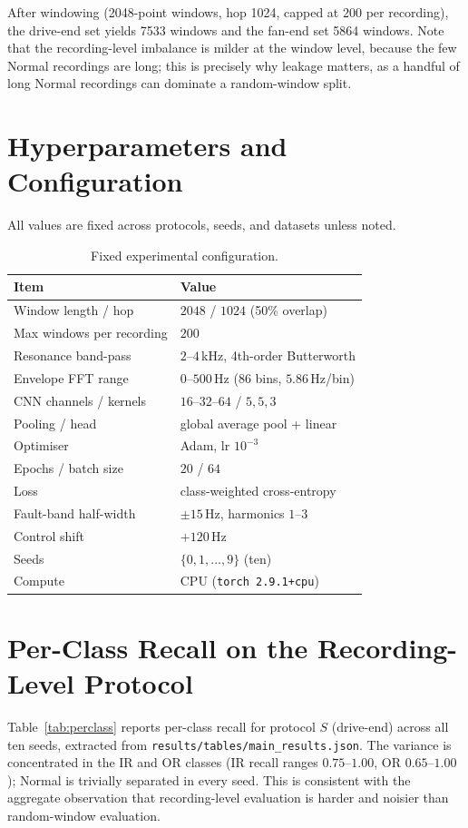\documentclass[11pt]{article}
\begin{document}
After windowing (2048-point windows, hop 1024, capped at 200 per recording), the drive-end
set yields 7533 windows and the fan-end set 5864 windows. Note that the recording-level
imbalance is milder at the window level, because the few Normal recordings are long; this
is precisely why leakage matters, as a handful of long Normal recordings can dominate a
random-window split.

\section{Hyperparameters and Configuration}
\label{app:hyper}
All values are fixed across protocols, seeds, and datasets unless noted.

\begin{table}[H]
\centering
\caption{Fixed experimental configuration.}
\label{tab:hyper}
\begin{tabular}{ll}
\toprule
Item & Value \\
\midrule
Window length / hop & $2048$ / $1024$ (50\% overlap) \\
Max windows per recording & $200$ \\
Resonance band-pass & $2$--$4$\,kHz, 4th-order Butterworth \\
Envelope FFT range & $0$--$500$\,Hz (86 bins, $5.86$\,Hz/bin) \\
CNN channels / kernels & $16$--$32$--$64$ / $5,5,3$ \\
Pooling / head & global average pool + linear \\
Optimiser & Adam, lr $10^{-3}$ \\
Epochs / batch size & $20$ / $64$ \\
Loss & class-weighted cross-entropy \\
Fault-band half-width & $\pm15$\,Hz, harmonics $1$--$3$ \\
Control shift & $+120$\,Hz \\
Seeds & $\{0,1,\dots,9\}$ (ten) \\
Compute & CPU (\texttt{torch 2.9.1+cpu}) \\
\bottomrule
\end{tabular}
\end{table}

\section{Per-Class Recall on the Recording-Level Protocol}
\label{app:perclass}
Table~\ref{tab:perclass} reports per-class recall for protocol $S$ (drive-end) across all
ten seeds, extracted from \texttt{results/tables/main\_results.json}. The variance is
concentrated in the IR and OR classes (IR recall ranges $0.75$--$1.00$, OR $0.65$--$1.00$);
Normal is trivially separated in every seed. This is consistent with the aggregate
observation that recording-level evaluation is harder and noisier than random-window
evaluation.
\end{document}
